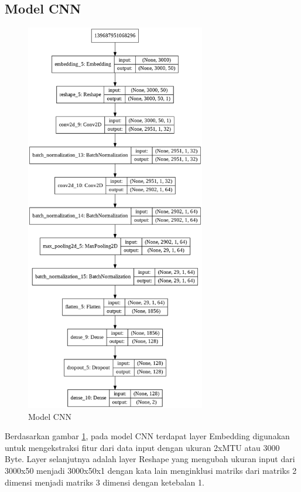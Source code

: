 \documentclass[./skripsi.tex]{subfiles}
\begin{document}
\subsection{Model CNN}
\begin{figure}%
    \centering
    \includegraphics[width=0.7\textwidth]{public/assets/img/CNNModel.png}
    \caption{Model CNN}
    \label{fig:model_cnn}
\end{figure}
\par Berdasarkan gambar \ref{fig:model_cnn}, pada model CNN terdapat layer Embedding digunakan untuk mengekstraksi fitur dari data input dengan ukuran 2xMTU atau 3000 Byte. Layer selanjutnya adalah layer Reshape yang mengubah ukuran input dari 3000x50 menjadi 3000x50x1 dengan kata lain menginklusi matriks dari matriks 2 dimensi menjadi matriks 3 dimensi dengan ketebalan 1.
\end{document}
